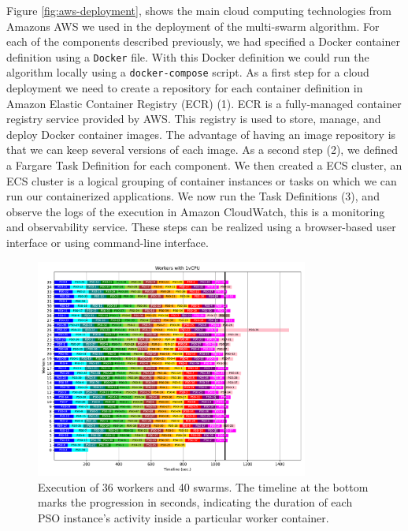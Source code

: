 \documentclass{cys}
\begin{document}
Figure \ref{fig:aws-deployment}, shows the main cloud computing technologies from 
Amazons AWS we used in the deployment of the multi-swarm algorithm. For each of the
components described previously, we had specified a Docker container definition using 
a \texttt{Docker} file. With this Docker definition we could run the algorithm locally
using a \texttt{docker-compose} script. As a first step for a cloud deployment we need to create 
a repository for each container definition in Amazon Elastic Container Registry (ECR) (1). 
ECR is a fully-managed container registry service provided by AWS. This registry is 
used to store, manage, and deploy Docker container images. The advantage of 
having an image repository is that we can keep several versions of each image. 
As a second step (2), we defined a Fargare Task Definition for each component. We then created a
ECS cluster, an ECS cluster is a logical grouping of container instances or tasks 
on which we can run our containerized applications. We now run the Task Definitions (3),
and observe the logs of the execution in Amazon CloudWatch, this is a monitoring and observability
service. These steps can be realized using a browser-based user interface or 
using command-line interface. 

\begin{figure}[h]
\centering
\includegraphics[width=0.8\textwidth]{plotW36P40}
\caption{Execution of 36 workers and 40 swarms. The timeline at the bottom marks 
the progression in seconds, indicating the duration of each PSO instance's activity 
inside a particular worker container.}
\label{fig:36w40s}
\end{figure}
\end{document}

